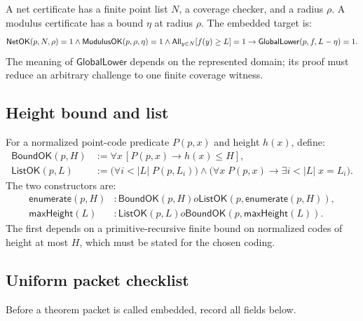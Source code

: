 A net certificate has a finite point list \(N\), a coverage checker, and a
radius \(\rho\).  A modulus certificate has a bound \(\eta\) at radius
\(\rho\).  The embedded target is:
\[
 \mathsf{NetOK}(p,N,\rho)=1\wedge
 \mathsf{ModulusOK}(p,\rho,\eta)=1\wedge
 \mathsf{All}_{y\in N}[f(y)\ge L]=1
 \to
 \mathsf{GlobalLower}(p,f,L-\eta)=1.
\]
The meaning of \(\mathsf{GlobalLower}\) depends on the represented domain; its
proof must reduce an arbitrary challenge to one finite coverage witness.

\subsection{Height bound and list}

For a normalized point-code predicate \(P(p,x)\) and height \(h(x)\), define:
\begin{align*}
 \mathsf{BoundOK}(p,H)&:=\forall x\,[P(p,x)\to h(x)\le H],\\
 \mathsf{ListOK}(p,L)&:=
   \bigl(\forall i<|L|\;P(p,L_i)\bigr)\wedge
   \bigl(\forall x\;P(p,x)\to\exists i<|L|\;x=L_i\bigr).
\end{align*}
The two constructors are:
\begin{align*}
 \mathsf{enumerate}(p,H)&:\mathsf{BoundOK}(p,H)	o
     \mathsf{ListOK}(p,\mathsf{enumerate}(p,H)),\\
 \mathsf{maxHeight}(L)&:\mathsf{ListOK}(p,L)	o
     \mathsf{BoundOK}(p,\mathsf{maxHeight}(L)).
\end{align*}
The first depends on a primitive-recursive finite bound on normalized codes of
height at most \(H\), which must be stated for the chosen coding.

\subsection{Uniform packet checklist}

Before a theorem packet is called embedded, record all fields below.

